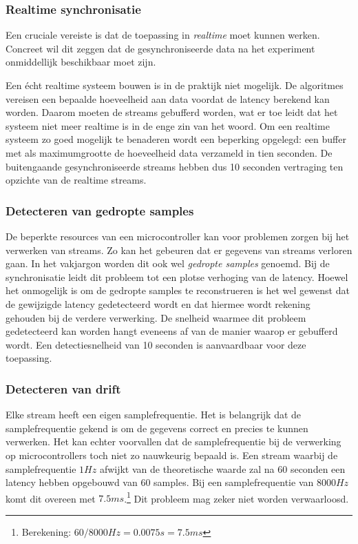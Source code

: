 \subsubsection{Realtime synchronisatie}

Een cruciale vereiste is dat de toepassing in \textit{realtime} moet kunnen werken. Concreet wil dit zeggen dat de gesynchroniseerde data na het experiment onmiddellijk beschikbaar moet zijn.

Een écht realtime systeem bouwen is in de praktijk niet mogelijk. De algoritmes vereisen een bepaalde hoeveelheid aan data voordat de latency berekend kan worden. Daarom moeten de streams gebufferd worden, wat er toe leidt dat het systeem niet meer realtime is in de enge zin van het woord. Om een realtime systeem zo goed mogelijk te benaderen wordt een beperking opgelegd: een buffer met als maximumgrootte de hoeveelheid data verzameld in tien seconden. De buitengaande gesynchroniseerde streams hebben dus 10 seconden vertraging ten opzichte van de realtime streams.

\subsubsection{Detecteren van gedropte samples}

De beperkte resources van een microcontroller kan voor problemen zorgen bij het verwerken van streams. Zo kan het gebeuren dat er gegevens van streams verloren gaan. In het vakjargon worden dit ook wel \textit{gedropte samples} genoemd. Bij de synchronisatie leidt dit probleem tot een plotse verhoging van de latency. Hoewel het onmogelijk is om de gedropte samples te reconstrueren is het wel gewenst dat de gewijzigde latency gedetecteerd wordt en dat hiermee wordt rekening gehouden bij de verdere verwerking. De snelheid waarmee dit probleem gedetecteerd kan worden hangt eveneens af van de manier waarop er gebufferd wordt. Een detectiesnelheid van 10 seconden is aanvaardbaar voor deze toepassing.

\subsubsection{Detecteren van drift}

Elke stream heeft een eigen samplefrequentie. Het is belangrijk dat de samplefrequentie gekend is om de gegevens correct en precies te kunnen verwerken. Het kan echter voorvallen dat de samplefrequentie bij de verwerking op microcontrollers toch niet zo nauwkeurig bepaald is. Een stream waarbij de samplefrequentie $ 1Hz $ afwijkt van de theoretische waarde zal na 60 seconden een latency hebben opgebouwd van 60 samples. Bij een samplefrequentie van $8000 Hz$ komt dit overeen met $7.5 ms$.\footnote{Berekening: $ 60 / 8000 Hz = 0.0075 s = 7.5 ms $} Dit probleem mag zeker niet worden verwaarloosd. 

